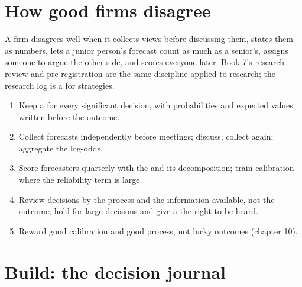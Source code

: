 \section{How good firms disagree}

A firm disagrees well when it collects views before discussing them, states them as numbers, lets a junior person's forecast count as much as a
senior's, assigns someone to argue the other side, and scores everyone later. Book 7's research review and pre-registration are the same
discipline applied to research; the research log is a  for strategies.

\begin{method}\label{met:fm:culture-and-decision-making:run}
\begin{enumerate}
\item Keep a  for every significant decision, with probabilities and expected values written before the outcome.
\item Collect forecasts independently before meetings; discuss; collect again; aggregate the log-odds.
\item Score forecasters quarterly with the  and its decomposition; train calibration where the reliability term is large.
\item Review decisions by the process and the information available, not the outcome; hold  for large decisions and give a  the right to be heard.
\item Reward good calibration and good process, not lucky outcomes (chapter 10).
\end{enumerate}
\end{method}

\section{Build: the decision journal}\label{bld:fm:culture-and-decision-making:decisionlog}

